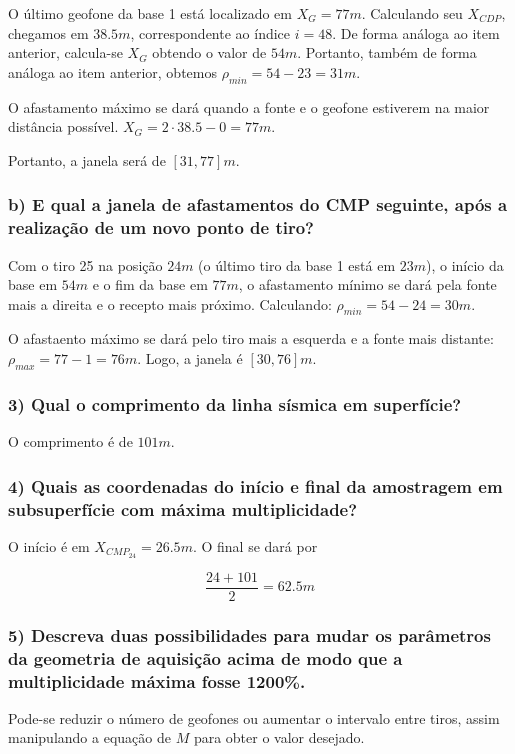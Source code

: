 \documentclass[12pt,a4paper]{article}
\begin{document}
O último geofone da base 1 está localizado em $X_G = 77m$. Calculando seu $X_{CDP}$, chegamos em $38.5m$, correspondente ao índice $i = 48$. De forma análoga ao item anterior, calcula-se $X_G$ obtendo o valor de $54m$. Portanto, também de forma análoga ao item anterior, obtemos $\rho_{min} = 54 - 23 = 31m$.

O afastamento máximo se dará quando a fonte e o geofone estiverem na maior distância possível. $X_G = 2 \cdot 38.5 - 0 = 77m$.

Portanto, a janela será de $[31,77]m$.




\subsubsection{b) E qual a janela de afastamentos do CMP seguinte, após a realização de um novo ponto de tiro?}


Com o tiro 25 na posição $24m$ (o último tiro da base 1 está em $23m$), o início da base em $54m$ e o fim da base em $77m$, o afastamento mínimo se dará pela fonte mais a direita e o recepto mais próximo. Calculando: $\rho_{min} = 54 - 24 = 30m$.

O afastaento máximo se dará pelo tiro mais a esquerda e a fonte mais distante: $\rho_{max} = 77 - 1 = 76m$. Logo, a janela é $[30, 76]m$.


\subsubsection{3) Qual o comprimento da linha sísmica em superfície?}

O comprimento é de $101m$. 


\subsubsection{4) Quais as coordenadas do início e final da amostragem em subsuperfície com máxima multiplicidade?}


O início é em $X_{CMP_{24}} = 26.5m$. O final se dará por 

$$ \frac{24 + 101}{2} = 62.5m$$




\subsubsection{5) Descreva duas possibilidades para mudar os parâmetros da geometria de aquisição acima de modo que a multiplicidade máxima fosse 1200\%.}


Pode-se reduzir o número de geofones ou aumentar o intervalo entre tiros, assim manipulando a equação de $M$ para obter o valor desejado. 
\end{document}
